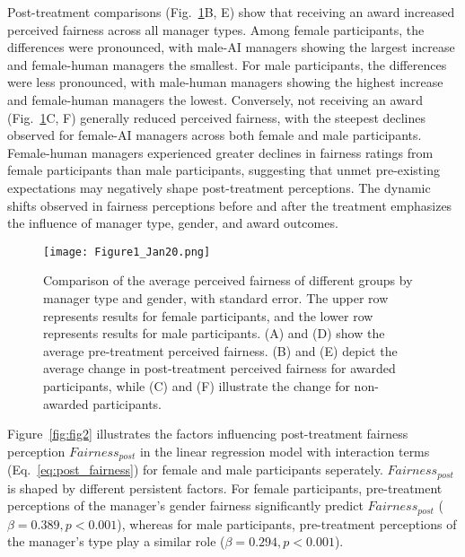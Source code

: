 \documentclass{article}
\begin{document}
Post-treatment comparisons (Fig.~\ref{fig:fig1}B, E) show that receiving an award increased perceived fairness across all manager types. Among female participants, the differences were pronounced, with male-AI managers showing the largest increase and female-human managers the smallest. For male participants, the differences were less pronounced, with male-human managers showing the highest increase and female-human managers the lowest.
Conversely, not receiving an award (Fig.~\ref{fig:fig1}C, F) generally reduced perceived fairness, with the steepest declines observed for female-AI managers across both female and male participants. 
Female-human managers experienced greater declines in fairness ratings from female participants than male participants,
suggesting that unmet pre-existing expectations may negatively shape post-treatment perceptions.
The dynamic shifts observed in fairness perceptions before and after the treatment emphasizes the influence of manager type, gender, and award outcomes. 

\begin{figure}[htbp] 
    \centering
    \texttt{[image: Figure1\_Jan20.png]} %
    \caption{Comparison of the average perceived fairness of different groups by manager type and gender, with standard error. 
    The upper row represents results for female participants, and the lower row represents results for male participants. (A) and (D) show the average pre-treatment perceived fairness. (B) and (E) depict the average change in post-treatment perceived fairness for awarded participants, while (C) and (F) illustrate the change for non-awarded participants.
} 
    \label{fig:fig1} 
\end{figure}


Figure~\ref{fig:fig2} illustrates the factors influencing post-treatment fairness perception $Fairness_{post}$ in the linear regression model with interaction terms (Eq.~\ref{eq:post_fairness}) for female and male participants seperately. 
$Fairness_{post}$ is shaped by different persistent factors.
For female participants, pre-treatment perceptions of the manager’s gender fairness significantly predict $Fairness_{post}$ ($\beta = 0.389, p < 0.001$), whereas for male participants, pre-treatment perceptions of the manager’s type play a similar role ($\beta = 0.294, p < 0.001$). 

\end{document}
